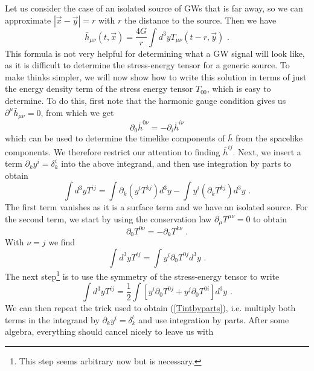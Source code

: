 \documentclass[11pt]{cuthesis}
\newcommand{\mn}{_{\mu\nu}}
\newcommand{\fs}{\text{ .}}
\begin{document}
Let us consider the case of an isolated source of GWs that is far away, so we can approximate $|\vec{x} - \vec{y}| = r$ with $r$ the distance to the source. Then we have
\begin{equation} \label{hbarmn}
\bar{h}\mn (t,\vec{x}) = \frac{4G}{r} \int d^3 y  T\mn (t-r,\vec{y}) \fs
\end{equation}
This formula is not very helpful for determining what a GW signal will look like, as it is difficult to determine the stress-energy tensor for a generic source. To make thinks simpler, we will now show how to write this solution in terms of just the energy density term of the stress energy tensor $T_{00}$, which is easy to determine. To do this, first note that the harmonic gauge condition gives us $\partial^\mu \bar{h}\mn = 0$, from which we get
\begin{equation}
 \partial_0 \bar{h}^{0\nu} = -\partial_i \bar{h}^{i\nu}
\end{equation}
which can be used to determine the timelike components of $\bar{h}$ from the spacelike components. We therefore restrict our attention to finding $\bar{h}^{ij}$. Next, we insert a term $\partial_k y^i = \delta_k^i$ into the above integrand, and then use integration by parts to obtain
\begin{equation} \label{Tintbyparts}
\int d^3 y  T^{ij} = \int  \partial_k(y^i T^{kj}) d^3 y - \int   y^i (\partial_k T^{kj}) d^3 y \fs
\end{equation}
The first term vanishes as it is a surface term and we have an isolated source. For the second term, we start by using the conservation law $\partial_\mu T^{\mu \nu}=0$ to obtain
\begin{equation}
\partial_0 T^{0\nu} = -\partial_k T^{k\nu} \fs
\end{equation} 
With $\nu = j$ we find
\begin{equation} \label{Tmn}
\int d^3 y  T^{ij} = \int y^i \partial_0 T^{0j} d^3 y \fs
\end{equation}
The next step\footnote{This step seems arbitrary now but is necessary.} is to use the symmetry of the stress-energy tensor to write
\begin{equation}
\int d^3 y  T^{ij} = \frac{1}{2}\int [y^i \partial_0 T^{0j} + y^j \partial_0 T^{0i}]d^3 y \fs
\end{equation}
We can then repeat the trick used to obtain (\ref{Tintbyparts}), i.e. multiply both terms in the integrand by $\partial_k y^i = \delta_k^l$ and use integration by parts. After some algebra, everything should cancel nicely to leave us with 
\end{document}
